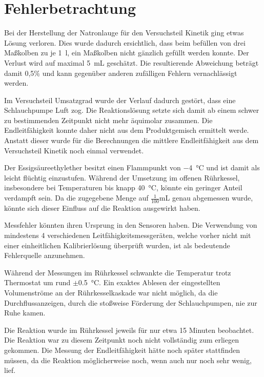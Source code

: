 \newpage
\section{Fehlerbetrachtung}
\label{sec:fehler}

Bei der Herstellung der Natronlauge für den Versuchsteil Kinetik ging etwas Lösung verloren. Dies wurde dadurch ersichtlich, dass beim befüllen von drei Maßkolben zu je \SI{1}{\litre}, ein Maßkolben nicht gänzlich gefüllt werden konnte. Der Verlust wird auf maximal \SI{5}{\milli\liter} geschätzt. Die resultierende Abweichung beträgt damit 0,5\% und kann gegenüber anderen zufälligen Fehlern vernachlässigt werden. 

Im Versuchsteil Umsatzgrad wurde der Verlauf dadurch gestört, dass eine Schlauchpumpe Luft zog. Die Reaktionslösung setzte sich damit ab einem schwer zu bestimmenden Zeitpunkt nicht mehr äquimolar zusammen. Die Endleitfähigkeit konnte daher nicht aus dem Produktgemisch ermittelt werde. Anstatt dieser wurde für die Berechnungen die mittlere Endleitfähigkeit aus dem Versuchsteil Kinetik noch einmal verwendet. 

Der Essigsäureethylether besitzt einen Flammpunkt von \SI{-4}{\degreeCelsius} und ist damit als leicht flüchtig einzustufen. Während der Umsetzung im offenen Rührkessel, insbesondere bei Temperaturen bis knapp \SI{40}{\degreeCelsius}, könnte ein geringer Anteil verdampft sein. Da die zugegebene Menge auf $\frac{1}{100}$\si{\milli\liter} genau abgemessen wurde, könnte sich dieser Einfluss auf die Reaktion ausgewirkt haben.

Messfehler könnten ihren Ursprung in den Sensoren haben. Die Verwendung von mindestens 4 verschiedenen Leitfähigkeitsmessgeräten, welche vorher nicht mit einer einheitlichen Kalibrierlösung überprüft wurden, ist als bedeutende Fehlerquelle anzunehmen.  

Während der Messungen im Rührkessel schwankte die Temperatur trotz Thermostat um rund $\pm$\SI{0,5}{\degreeCelsius}. 
Ein exaktes Ablesen der eingestellten Volumenströme an der Rührkesselkaskade war nicht möglich, da die Durchflussanzeigen, durch die stoßweise Förderung der Schlauchpumpen, nie zur Ruhe kamen.

Die Reaktion wurde im Rührkessel jeweils für nur etwa 15 Minuten beobachtet. Die Reaktion war zu diesem Zeitpunkt noch nicht vollständig zum erliegen gekommen. Die Messung der Endleitfähigkeit hätte noch später stattfinden müssen, da die Reaktion möglicherweise noch, wenn auch nur noch sehr wenig, lief.
